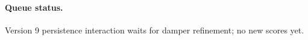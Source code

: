 \paragraph{Queue status.} Version 9 persistence interaction waits for damper refinement; no new scores yet.

